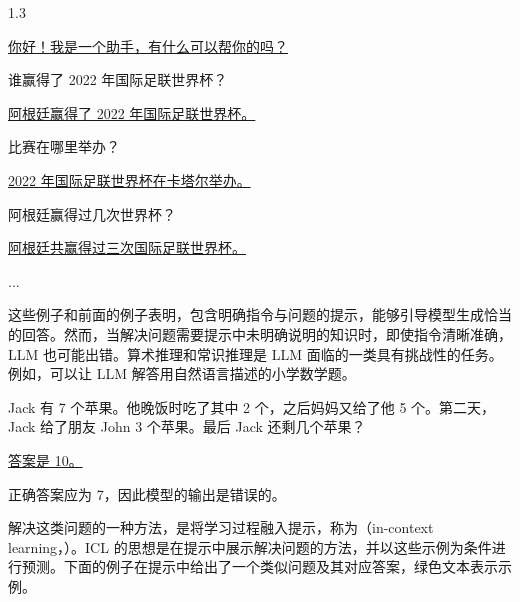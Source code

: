 \vspace{0.5em}
\begin{tcolorbox}
\begin{center}
\parbox{0.9\textwidth}
{

\begin{spacing}{1.3}

\underline{ 你好！我是一个助手，有什么可以帮你的吗？}

{\color{blue} 谁赢得了 2022 年国际足联世界杯？}

\underline{阿根廷赢得了 2022 年国际足联世界杯。}

{\color{blue} 比赛在哪里举办？}

\underline{2022 年国际足联世界杯在卡塔尔举办。}

{\color{blue} 阿根廷赢得过几次世界杯？}

\underline{阿根廷共赢得过三次国际足联世界杯。}

...

\end{spacing}

}
\end{center}
\end{tcolorbox}
\vspace{0.5em}

这些例子和前面的例子表明，包含明确指令与问题的提示，能够引导模型生成恰当的回答。然而，当解决问题需要提示中未明确说明的知识时，即使指令清晰准确，LLM 也可能出错。算术推理和常识推理是 LLM 面临的一类具有挑战性的任务。例如，可以让 LLM 解答用自然语言描述的小学数学题。

\vspace{0.5em}
\begin{tcolorbox}
\begin{center}
\parbox{0.9\textwidth}
{

{\color{blue} Jack 有 7 个苹果。他晚饭时吃了其中 2 个，之后妈妈又给了他 5 个。第二天，Jack 给了朋友 John 3 个苹果。最后 Jack 还剩几个苹果？}

\vspace{0.3em}

\underline{答案是 10。}

}
\end{center}
\end{tcolorbox}
\vspace{0.5em}

\noindent 正确答案应为 7，因此模型的输出是错误的。

解决这类问题的一种方法，是将学习过程融入提示，称为（in-context learning，）。ICL 的思想是在提示中展示解决问题的方法，并以这些示例为条件进行预测。下面的例子在提示中给出了一个类似问题及其对应答案，绿色文本表示示例。


